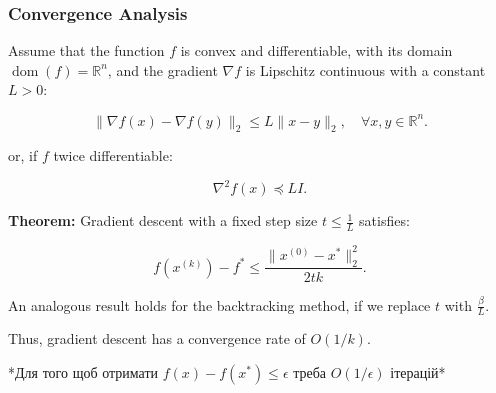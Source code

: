 \documentclass[a4paper,12pt]{article}
\begin{document}
\subsubsection{Convergence Analysis}

Assume that the function $f$ is convex and differentiable, with its domain $\operatorname{dom}(f) = \mathbb{R}^n$, and the gradient $\nabla f$ is Lipschitz continuous with a constant $L > 0$:


\[
\|\nabla f(x) - \nabla f(y)\|_2 \leq L \|x - y\|_2, \quad \forall x, y \in \mathbb{R}^n.
\]

or, if $f$ twice differentiable:

\[
\nabla^2 f(x) \preceq L I.
\]

\textbf{Theorem:} Gradient descent with a fixed step size $t \leq \frac{1}{L}$ satisfies:

\[
f(x^{(k)}) - f^* \leq \frac{\|x^{(0)} - x^*\|_2^2}{2tk}.
\]

An analogous result holds for the backtracking method, if we replace $t$ with $\frac{\beta}{L}$.

Thus, gradient descent has a convergence rate of $O(1/k)$.


*Для того щоб отримати $f(x) - f(x^*) \leq \epsilon$ треба $O(1/\epsilon)$ ітерацій*
\end{document}
